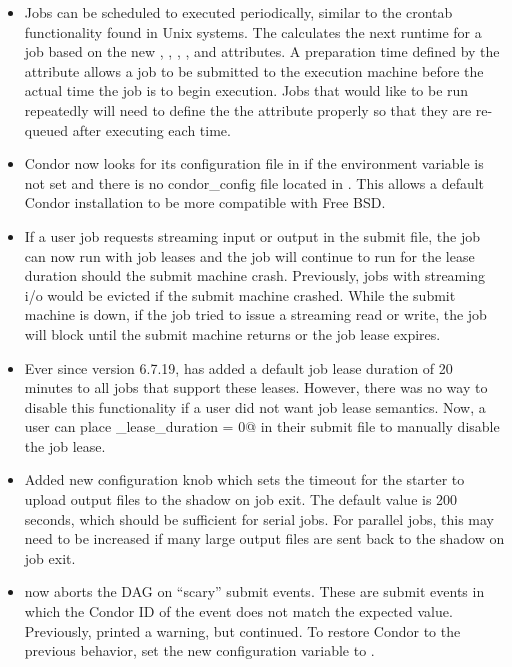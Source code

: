 \begin{itemize}
\item Jobs can be scheduled to executed periodically, similar to the crontab
functionality found in Unix systems. The  calculates the next
runtime for a job based on the new , ,
, , and
 attributes. A preparation time defined by the
 attribute allows a job to be submitted to the
execution machine before the actual time the job is to begin execution.
Jobs that would like to be run repeatedly will need to define the
the  attribute properly so that they are
re-queued after executing each time.

\item Condor now looks for its configuration file in 
if the  environment variable is not set and there is
no condor\_config file located in . This allows a default
Condor installation to be more compatible with Free BSD.

\item If a user job requests streaming input or output in the submit
file, the job can now run with job leases and the job will continue
to run for the lease duration should the submit machine crash.  Previously,
jobs with streaming i/o would be evicted if the submit machine crashed.
While the submit machine is down, if the job tried to issue a streaming
read or write, the job will block until the submit machine returns or the
job lease expires.

\item Ever since version 6.7.19,  has added a default
  job lease duration of 20 minutes to all jobs that support these
  leases.
  However, there was no way to disable this functionality if a user
  did not want job lease semantics.
  Now, a user can place \verb@job_lease_duration = 0@ in their submit
  file to manually disable the job lease.

\item Added new configuration knob 
which sets the timeout for the starter to upload output files to the
shadow on job exit.  The default value is 200 seconds, which should
be sufficient for serial jobs.  For parallel jobs, this may need to
be increased if many large output files are sent back to the shadow
on job exit.

\item {} now aborts the DAG on ``scary'' submit events.
These are submit events in which
the Condor ID of the event does not match the
expected value.
Previously,  printed a warning, but continued.
To restore Condor to the previous behavior,
set the new  configuration variable
to .


\end{itemize}
